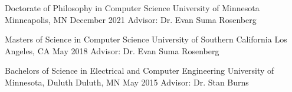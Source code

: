 
\begin{cventries}
  \cventry
    {Doctorate of Philosophy in Computer Science}%
    {University of Minnesota} %
    {Minneapolis, MN} %
    {December 2021} %
    {Advisor: Dr. Evan Suma Rosenberg}
    
  \cventry
    {Masters of Science in Computer Science} %
    {University of Southern California} %
    {Los Angeles, CA} %
    {May 2018} %
    {Advisor: Dr. Evan Suma Rosenberg}
    
  \cventry
    {Bachelors of Science in Electrical and Computer Engineering} %
    {University of Minnesota, Duluth} %
    {Duluth, MN} %
    {May 2015} %
    {Advisor: Dr. Stan Burns}
\end{cventries}

